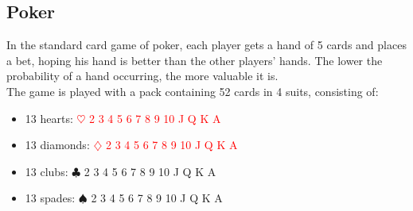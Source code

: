 \documentclass{article}
\begin{document}
\subsection{Poker}
In the standard card game of poker, each player gets a hand of 5 cards and places a bet, hoping his hand is better than the other players' hands. The lower the probability of a hand occurring, the more valuable it is.\\[1ex]
The game is played with a pack containing 52 cards in 4 suits, consisting of:
\begin{itemize}
\item 13 hearts: \textcolor{red}{$\heartsuit$ 2 3 4 5 6 7 8 9 10 J Q K A}
\item 13 diamonds: \textcolor{red}{$\diamondsuit$ 2 3 4 5 6 7 8 9 10 J Q K A}
\item 13 clubs: $\clubsuit$ 2 3 4 5 6 7 8 9 10 J Q K A
\item 13 spades: $\spadesuit$ 2 3 4 5 6 7 8 9 10 J Q K A 
\end{itemize}
\end{document}
